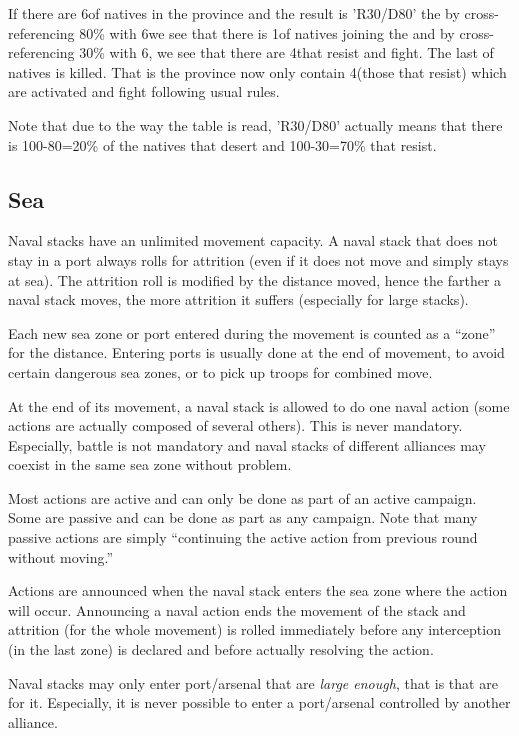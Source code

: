 \begin{exemple}
  If there are 6\LD of natives in the province and the result is 'R30/D80' the
  by cross-referencing 80\% with 6\LD we see that there is 1\LD of natives
  joining the \LeaderC and by cross-referencing 30\% with 6\LD, we see that
  there are 4\LD that resist and fight. The last \LD of natives is
  killed. That is the province now only contain 4\LD (those that resist) which
  are activated and fight following usual rules.

  Note that due to the way the table is read, 'R30/D80' actually means that
  there is 100-80=20\% of the natives that desert and 100-30=70\% that resist.
\end{exemple}

\subsection{Sea}
Naval stacks have an unlimited movement capacity. A naval stack that does not
stay in a port always rolls for attrition (even if it does not move and simply
stays at sea). The attrition roll is modified by the distance moved, hence the
farther a naval stack moves, the more attrition it suffers (especially for
large stacks).

Each new sea zone or port entered during the movement is counted as a ``zone''
for the distance. Entering ports is usually done at the end of movement, to
avoid certain dangerous sea zones, or to pick up troops for combined move.

At the end of its movement, a naval stack is allowed to do one naval action
(some actions are actually composed of several others). This is never
mandatory. Especially, battle is not mandatory and naval stacks of different
alliances may coexist in the same sea zone without problem.

Most actions are active and can only be done as part of an active
campaign. Some are passive and can be done as part as any campaign. Note that
many passive actions are simply ``continuing the active action from previous
round without moving.''

Actions are announced when the naval stack enters the sea zone where the
action will occur. Announcing a naval action ends the movement of the stack
and attrition (for the whole movement) is rolled immediately before any
interception (in the last zone) is declared and before actually resolving the
action.

Naval stacks may only enter port/arsenal that are \emph{large enough}, that is
that are \SoS for it. Especially, it is never possible to enter a port/arsenal
controlled by another alliance.

